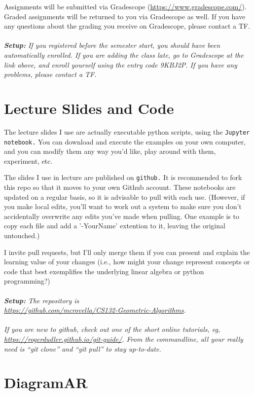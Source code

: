 \documentclass[11pt]{article}
\begin{document}
Assignments will be submitted via Gradescope
(\url{https://www.gradescope.com/}).    Graded assignments will 
be returned to you via Gradescope as well.   If you have any questions
about the grading you receive on Gradescope, please contact a TF.
\\
~\\\emph{\textbf{Setup:} If you registered before the semester start,
  you should have been automatically enrolled.  If you are adding the
  class late, go to Gradescope at the link above, and enroll yourself
  using the entry code 9KBJ2P.   If you have any
  problems, please contact a TF.}

\section*{Lecture Slides and Code} 

The lecture slides I use are actually executable python scripts, using the
\texttt{Jupyter notebook.}   You can
download and execute the examples on your own computer, and you can
modify them any way you'd like, play around with them, experiment, etc.

The slides I use in lecture are published on \texttt{github.}   
It is recommended to fork this repo so that it moves to your own Github
account. These notebooks are updated on a regular basis, so it is
advisable to pull with each use.  (However, if you make local edits,
you'll want to work out a 
system to make sure you don't accidentally overwrite any edits you've
made when pulling. One example is to copy each file and add a
'-YourName' extention to it, leaving the original untouched.)

I invite pull requests, but I'll only merge them
if you can present and explain the learning value of your changes (i.e.,
how might your change represent concepts or code that best
exemplifies the underlying linear algebra or python
programming?) 
\\
~\\\emph{\textbf{Setup:} The
repository is \\
\url{https://github.com/mcrovella/CS132-Geometric-Algorithms}.  \\~\\
  If you are new to github, check out one of the short online tutorials,
eg, \url{https://rogerdudler.github.io/git-guide/}.  From the
commandline, all your really need is ``git clone'' and ``git pull''  to
stay up-to-date.}

\section*{DiagramAR} 
\end{document}
